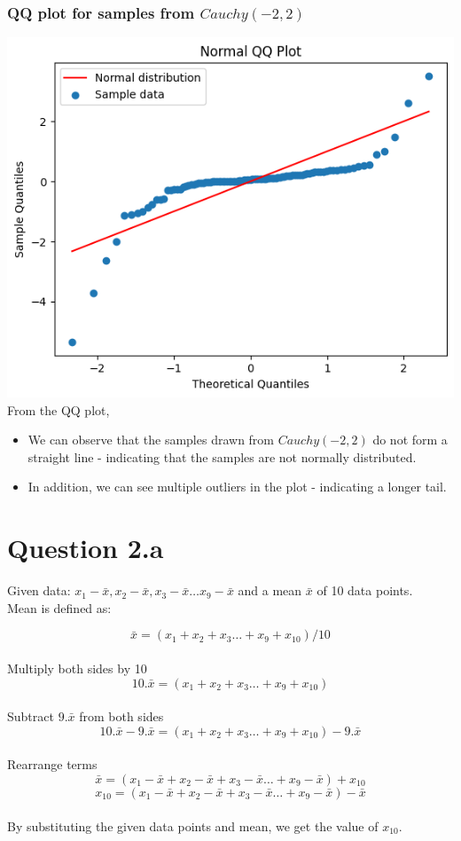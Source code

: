 \documentclass[12pt]{article}
\begin{document}
\subsubsection*{QQ plot for samples from \(Cauchy(-2, 2)\)}
\includegraphics[width=\linewidth]{graph1e}
From the QQ plot,
\begin{itemize}
    \item We can observe that the samples drawn from \(Cauchy(-2, 2)\) do not form
    a straight line - indicating that the samples are not normally distributed.
    \item In addition, we can see multiple outliers in the plot - indicating a
    longer tail.
\end{itemize}

\newpage
\section*{Question 2.a}
Given data: \(x_1 - \bar{x}, x_2 - \bar{x}, x_3 - \bar{x} \dots x_9 - \bar{x}\)
and a mean \(\bar{x}\) of 10 data points.
\\[\baselineskip]
Mean is defined as:

\[\bar{x} = (x_1 + x_2 + x_3 \dots + x_9 + x_{10}) / 10\]
\\
Multiply both sides by 10
\[10 . \bar{x} = (x_1 + x_2 + x_3 \dots + x_9 + x_{10})\]
\\
Subtract \(9.\bar{x}\) from both sides
\[10. \bar{x} - 9.\bar{x} = (x_1 + x_2 + x_3 \dots + x_9 + x_{10}) - 9.\bar{x}\]
\\
Rearrange terms
\[\bar{x} = (x_1 - \bar{x} + x_2 - \bar{x} + x_3 - \bar{x} \dots + x_9 - \bar{x}) + x_{10}\]
\[x_{10} =  (x_1 - \bar{x} + x_2 - \bar{x} + x_3 - \bar{x} \dots + x_9 - \bar{x}) - \bar{x}\]
\\
By substituting the given data points and mean, we get the value of \(x_{10}\).
\\
\end{document}
